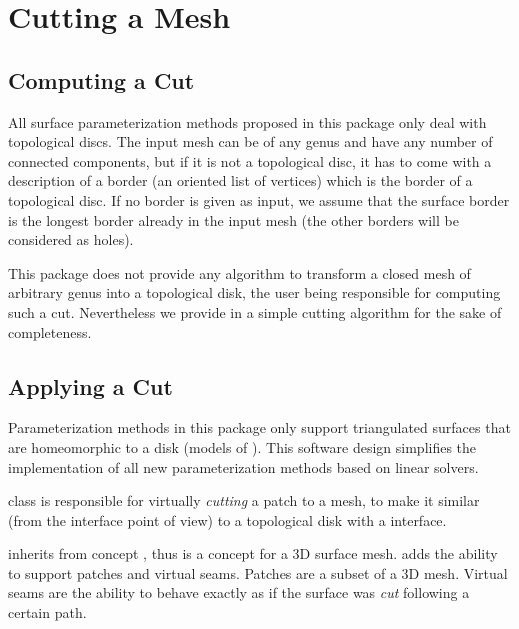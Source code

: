 \section{Cutting a Mesh}

\subsection{Computing a Cut}

All surface parameterization methods proposed in this package only
deal with topological discs.  The input mesh can be of any genus and
have any number of connected components, but if it is not a topological
disc, it has to come with a description of a border (an oriented list of
vertices) which is the border of a topological disc.  If no border  is
given as input, we assume that the surface border is the longest border already
in the input mesh (the other borders will be considered as holes).


This package does not provide any algorithm to transform a closed mesh
of arbitrary genus into a topological disk, the user being responsible
for computing such a cut. Nevertheless we provide in
 a simple cutting algorithm for
the sake of completeness.


\subsection{Applying a Cut}

Parameterization methods in this package only support triangulated
surfaces that are homeomorphic to a disk (models of
). This software design simplifies the
implementation of all new parameterization methods based on linear
solvers.

class is responsible for virtually
{\em cutting} a patch to a  mesh,
to make it similar (from the interface point of view) to a topological
disk with a  interface.

 inherits from concept ,
thus is a concept for a 3D surface mesh.
 adds the ability to support patches and
virtual seams. Patches are a subset of a 3D mesh. Virtual seams are the ability
to behave exactly as if the surface was {\em cut} following a certain path.


